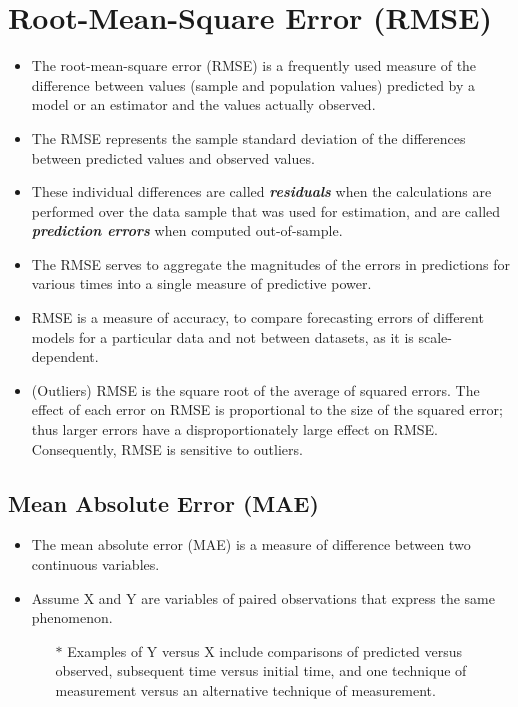 \documentclass[]{report}
\begin{document}
\section*{Root-Mean-Square Error (RMSE) }
\begin{itemize}
\item The root-mean-square error (RMSE) is a frequently used measure of the difference between values (sample and population values) predicted by a model or an estimator and the values actually observed. 
\item The RMSE represents the sample standard deviation of the differences between predicted values and observed values. 

\item These individual differences are called \textbf{\textit{residuals}} when the calculations are performed over the data sample that was used for estimation, and are called \textbf{\textit{prediction errors}} when computed out-of-sample. 
\item The RMSE serves to aggregate the magnitudes of the errors in predictions for various times into a single measure of predictive power. 
\item RMSE is a measure of accuracy, to compare forecasting errors of different models for a particular data and not between datasets, as it is scale-dependent.
\item (Outliers)
RMSE is the square root of the average of squared errors. The effect of each error on RMSE is proportional to the size of the squared error; thus larger errors have a disproportionately large effect on RMSE. Consequently, RMSE is sensitive to outliers.
\end{itemize}
\subsection*{Mean Absolute Error (MAE)}
\begin{itemize}
	\item The mean absolute error (MAE) is a measure of difference between two continuous variables. 
	\item Assume X and Y are variables of paired observations that express the same phenomenon. 
	\begin{itemize}
		\item[$\ast$] Examples of Y versus X include comparisons of predicted versus observed, subsequent time versus initial time, and one technique of measurement versus an alternative technique of measurement.
	\end{itemize}
\end{itemize}
 
\end{document}
